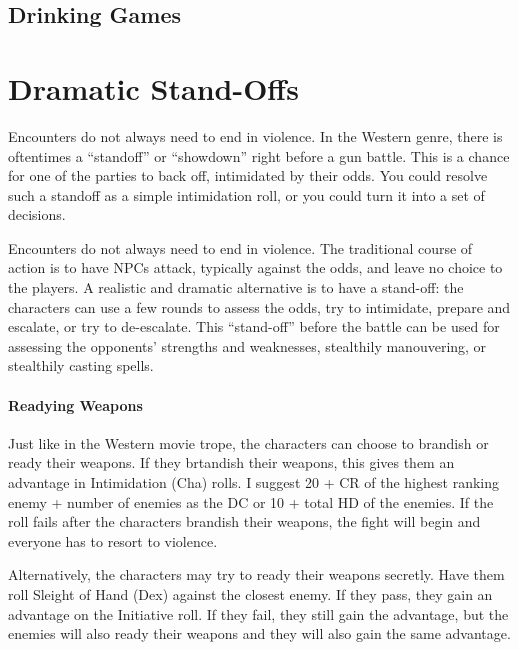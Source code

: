 \documentclass[twocolumn]{dndbook}
\begin{document}

\subsection{Drinking Games}

\section{Dramatic Stand-Offs}
\label{sec:dramatic_standoff}


Encounters do not always need to end in violence.
In the Western genre, there is oftentimes a ``standoff'' or ``showdown'' right before a gun battle.
This is a chance for one of the parties to back off, intimidated by their odds.
You could resolve such a standoff as a simple intimidation roll, or you could turn it into a set of decisions.\par

\begin{emphasisParagraph}
	Encounters do not always need to end in violence.
	The traditional course of action is to have NPCs attack, typically against the odds, and leave no choice to the players.
	A realistic and dramatic alternative is to have a stand-off: the characters can use a few rounds to assess the odds,
	try to intimidate, prepare and escalate, or try to de-escalate.
	This ``stand-off'' before the battle can be used for assessing the opponents' strengths and weaknesses,
	stealthily manouvering, or stealthily casting spells.
\end{emphasisParagraph}

\paragraph*{Readying Weapons}
Just like in the Western movie trope, the characters can choose to brandish or ready their weapons.
If they brtandish their weapons, this gives them an advantage in Intimidation (Cha) rolls.
I suggest 20 + CR of the highest ranking enemy + number of enemies as the DC or 10 + total HD of the enemies.
If the roll fails after the characters brandish their weapons, the fight will begin and everyone has to resort to violence.\par

Alternatively, the characters may try to ready their weapons secretly.
Have them roll Sleight of Hand (Dex) against the closest enemy.
If they pass, they gain an advantage on the Initiative roll.
If they fail, they still gain the advantage, but the enemies will also ready their weapons and they will also gain the same advantage.\par
\end{document}
